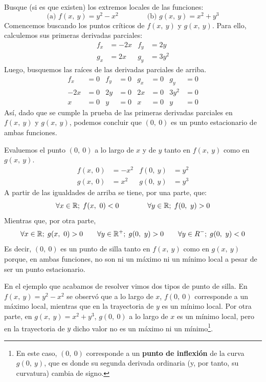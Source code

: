 \documentclass[12pt]{article}
\begin{document}
\ejemplo Busque (si es que existen) los extremos locales de las funciones:
\[
  \text{(a) } f(x, \ y) = y^{2} - x^{2} \qquad \qquad
  \text{(b) } g(x, \ y) = x^{2} + y^{3}
\]
\solucion Comencemos buscando los puntos críticos de $f(x, \ y)$ y $g(x, \ y)$. Para ello, calculemos sus primeras derivadas parciales:
\begin{align*}
  f_{x} &= -2x & f_{y} &= 2y \\
  g_{x} &= 2x  & g_{y} &= 3y^{2}
\end{align*}
Luego, busquemos las raíces de las derivadas parciales de arriba.
\begin{align*}
f_{x} &= 0  &  f_{y} &= 0  &  g_{x} &= 0  &   g_{y} &= 0 \\
  -2x &= 0  &     2y &= 0  &     2x &= 0  &  3y^{2} &= 0 \\
    x &= 0  &      y &= 0  &      x &= 0  &       y &= 0
\end{align*}
Así, dado que se cumple la prueba de las primeras derivadas parciales en $f(x, \ y)$ y $g(x, \ y)$, podemos concluir que $(0, \ 0)$ es un punto estacionario de ambas funciones.

Evaluemos el punto $(0, \ 0)$ a lo largo de $x$ y de $y$ tanto en $f(x, \ y)$ como en $g(x, \ y)$.
\begin{align*}
  f(x, \ 0) &= -x^{2} & f(0, \ y) &= y^{2} \\
  g(x, \ 0) &= x^{2}  & g(0, \ y) &= y^{3}
\end{align*}
A partir de las igualdades de arriba se tiene, por una parte, que:
\[
  \forall x \in \mathbb{R}; \; f(x, \ 0) < 0 \qquad \qquad
  \forall y \in \mathbb{R}; \; f(0, \ y) > 0
\]
Mientras que, por otra parte,
\[
  \forall x \in \mathbb{R}; \; g(x, \ 0) > 0 \qquad
  \forall y \in \mathbb{R}^{+}; \; g(0, \ y) > 0 \qquad
  \forall y \in R^{-}; \; g(0, \ y) < 0
\]
Es decir, $(0, \ 0)$ es un punto de silla tanto en $f(x, \ y)$ como en $g(x, \ y)$ porque, en ambas funciones, no son ni un máximo ni un mínimo local a pesar de ser un punto estacionario.

En el ejemplo que acabamos de resolver vimos dos tipos de punto de silla. En $f(x, \ y) = y^{2} - x^{2}$ se observó que a lo largo de $x$, $f(0, \ 0)$ corresponde a un máximo local, mientras que en la trayectoria de $y$ es un mínimo local. Por otra parte, en $g(x, \ y) = x^{2} + y^{3}$, $g(0, \ 0)$ a lo largo de $x$ es un mínimo local, pero en la trayectoria de $y$ dicho valor no es un máximo ni un mínimo\footnote{En este caso, $(0, \ 0)$ corresponde a un \textbf{punto de inflexión} de la curva $g(0, \ y)$, que es donde su segunda derivada ordinaria (y, por tanto, su curvatura) cambia de signo.}.
\end{document}
